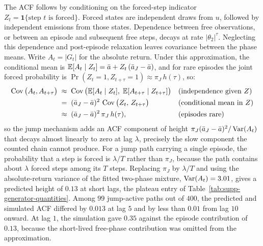 The ACF follows by conditioning on the
forced-step indicator $Z_t = \mathbf{1}\{\text{step $t$ is forced}\}$.
Forced states are independent draws from $u$, followed by independent emissions from those states. Dependence between free observations, or between an episode and subsequent free steps, decays at rate $|\theta_2|^\tau$. Neglecting this dependence and post-episode relaxation leaves covariance between the phase means. Write
$A_t = |G_t|$ for the absolute return. Under this approximation, the conditional mean is
$\mathbb{E}[A_t \mid Z_t] = \bar a + Z_t\, (\bar a_J - \bar a)$,
and for rare episodes the joint forced probability is
$\Pr(Z_t = 1, Z_{t+\tau} = 1) \approx \pi_J\, h(\tau)$, so:
\begin{align}
  \operatorname{Cov}\big(A_t, A_{t+\tau}\big)
   &\;\approx\;
     \operatorname{Cov}\big(\mathbb{E}[A_t \mid Z_t],\;
              \mathbb{E}[A_{t+\tau} \mid Z_{t+\tau}]\big)
     && \text{(independence given $Z$)} \notag \\
   &\;=\; (\bar a_J - \bar a)^2\,
     \operatorname{Cov}\big(Z_t,\, Z_{t+\tau}\big)
     && \text{(conditional mean in $Z$)} \notag \\
   &\;\approx\; (\bar a_J - \bar a)^2\, \pi_J\, h(\tau),
     && \text{(episodes rare)}
  \label{eq:supp-acf-wj}
\end{align}
so the jump mechanism adds an ACF component of height $\pi_J (\bar a_J
- \bar a)^2 / \operatorname{Var}(A_t)$ that decays almost linearly to zero at lag
$\lambda$, precisely the slow component the counted chain cannot
produce. For a jump path carrying a single episode, the probability
that a step is forced is $\lambda / T$ rather than $\pi_J$, because
the path contains about $\lambda$ forced steps among its $T$ steps.
Replacing $\pi_J$ by $\lambda / T$ and using the absolute-return
variance of the fitted two-phase mixture, $\operatorname{Var}(A_t) = 3.01$, gives a predicted height
of $0.13$ at short lags, the plateau entry of
Table~\ref{tab:supp-generator-quantities}.
Among $99$ jump-active paths out of $400$, the predicted and simulated ACF differed by $0.013$ at lag $5$ and by less than $0.01$ from lag $10$ onward. At lag $1$, the simulation gave $0.35$ against the episode contribution of $0.13$, because the short-lived free-phase contribution was omitted from the approximation.

